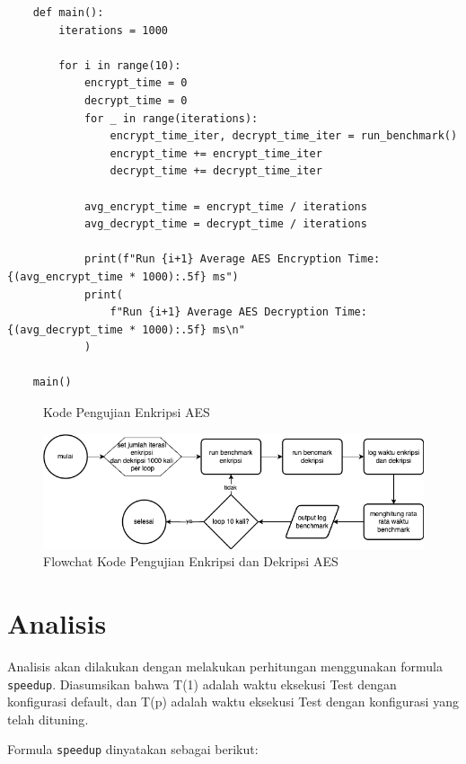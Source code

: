 \begin{verbatim}
    def main():
        iterations = 1000

        for i in range(10):
            encrypt_time = 0
            decrypt_time = 0
            for _ in range(iterations):
                encrypt_time_iter, decrypt_time_iter = run_benchmark()
                encrypt_time += encrypt_time_iter
                decrypt_time += decrypt_time_iter

            avg_encrypt_time = encrypt_time / iterations
            avg_decrypt_time = decrypt_time / iterations

            print(f"Run {i+1} Average AES Encryption Time: {(avg_encrypt_time * 1000):.5f} ms")
            print(
                f"Run {i+1} Average AES Decryption Time: {(avg_decrypt_time * 1000):.5f} ms\n"
            )

    main()
\end{verbatim}
\begin{figure}
    \caption{Kode Pengujian Enkripsi AES}
    \label{code:pengujian_enkripsi_aes}
\end{figure}

\begin{figure}
    \centering
    \includegraphics[width=1\textwidth]
    {assets/pics/code-flowchart/flowchart_aes.png}
    \caption{Flowchat Kode Pengujian Enkripsi dan Dekripsi AES}
    \label{fig:flowchart_aes}
\end{figure}

\section{Analisis}
Analisis akan dilakukan dengan melakukan perhitungan menggunakan formula \texttt{speedup}. Diasumsikan bahwa T(1) adalah waktu eksekusi Test dengan konfigurasi default, dan T(p) adalah waktu eksekusi Test dengan konfigurasi yang telah dituning\cite{beuwolfCetin}.

Formula \texttt{speedup} dinyatakan sebagai berikut:

